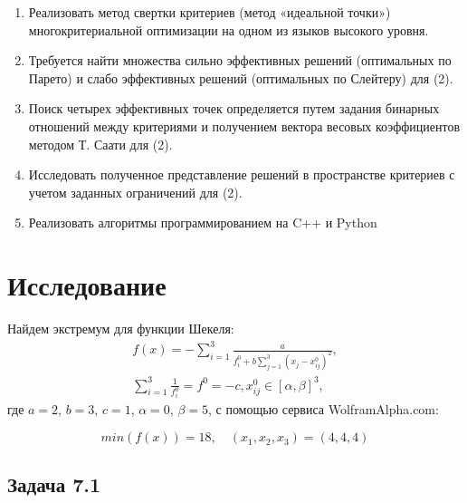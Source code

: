 \documentclass[a4paper, 12pt]{article}   	%
\begin{document}
    \begin{enumerate}
        \item Реализовать метод свертки критериев (метод «идеальной точки») многокритериальной оптимизации на одном из языков высокого уровня.
    	\item Требуется найти множества сильно эффективных решений (оптимальных по Парето) и слабо эффективных решений  (оптимальных по Слейтеру) для (2).
    	\item Поиск  четырех эффективных точек определяется путем задания бинарных отношений между критериями и получением вектора весовых коэффициентов методом Т. Саати для (2).
    	\item Исследовать полученное представление решений в пространстве критериев с учетом заданных ограничений для (2).
    	\item Реализовать алгоритмы программированием на C++ и Python
    \end{enumerate}

    
    
\newpage
\section{Исследование}
    Найдем экстремум для функции Шекеля:
        \begin{multline}
        f(x) = -\sum_{i=1}^3 \frac{a}{f_i^0 + b \sum_{j=1}^{3} (x_j - x_{ij}^0)^2}, \\ \sum_{i=1}^3 \frac{1}{f_i^0} = f^0 = -c, x_{ij}^0 \in [\alpha, \beta]^3, 
    \end{multline}
    где $a=2$, $b=3$, $c=1$, $\alpha = 0$, $\beta = 5$, с помощью сервиса WolframAlpha.com:
        
     \begin{equation}
        min(f(x)) = 18,\quad (x_1, x_2, x_3) = (4, 4, 4)
    \end{equation}
    
\subsection{Задача 7.1}
\end{document}
